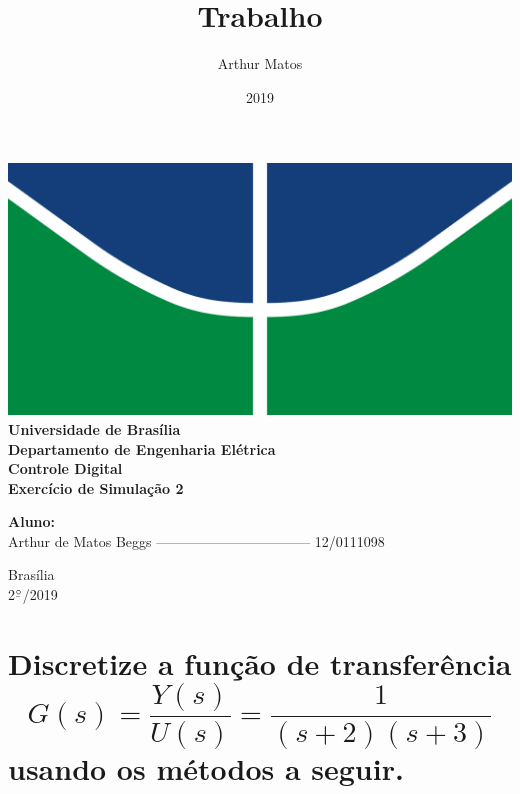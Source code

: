 \documentclass{article}
\title{Trabalho}
\author{Arthur Matos}
\date{2019}
\newcommand{\ubar}[1]{\underaccent{\bar}{#1}}
\begin{document}
\begin{titlepage}
    \begin{center}
        \centering
        \includegraphics[width=.7\linewidth]{images/logo_unb.png}\\[0.5cm]
        {\large \textbf{Universidade de Brasília}}\\[0.2cm]
        {\large \textbf{Departamento de Engenharia Elétrica}}\\[0.2cm]
        {\large \textbf{Controle Digital}}\\[4.8cm]
        {\bf \huge {Exercício de Simulação 2}}\\[0.2cm]
        {\bf \large {}}
    \end{center}

    \vspace{5cm}
    \hspace{2cm} {\noindent \bf \large {Aluno:}}\\
    \vspace{0.8cm}
    \hspace{2.35cm} {\large Arthur de Matos Beggs --------------------------------- 12/0111098}\\[1cm]

    \begin{center}
        {\large Brasília}\\
        {\large 2$^{\ubar{\circ}}$/2019}
    \end{center}

\end{titlepage}
\clearpage
\setcounter{page}{2}
\clearpage



\section{Discretize a função de transferência $$ G(s) = \frac{Y(s)}{U(s)} = \frac{1}{(s+2)(s+3)} $$ usando os métodos a seguir.}
\end{document}
